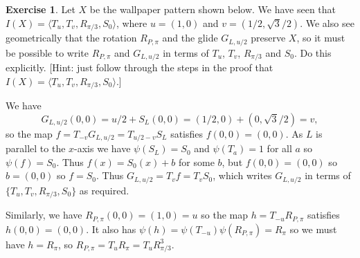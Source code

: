 \documentclass{amsart}
\renewcommand{\:}{\colon}
\newcommand{\ip}[1]{\langle #1\rangle}
\theoremstyle{definition}
\newtheorem{exercise}{Exercise}
\newenvironment{solution}{{\noindent\bf Solution:}}{}
\begin{document}
\begin{solution}
\end{solution}

\begin{exercise}
 Let $X$ be the wallpaper pattern shown below.  We have seen that
 $I(X)=\ip{T_u,T_v,R_{\pi/3},S_0}$, where $u=(1,0)$ and
 $v=(1/2,\sqrt{3}/2)$.  We also see geometrically that the rotation
 $R_{P,\pi}$ and the glide $G_{L,u/2}$ preserve $X$, so it must be
 possible to write $R_{P,\pi}$ and $G_{L,u/2}$ in terms of $T_u$,
 $T_v$, $R_{\pi/3}$ and $S_0$.  Do this explicitly.  [Hint: just
 follow through the steps in the proof that
 $I(X)=\ip{T_u,T_v,R_{\pi/3},S_0}$.]
 \begin{center}
 \end{center}
\end{exercise}
\begin{solution}
 We have 
 \[ G_{L,u/2}(0,0)=u/2+S_L(0,0)=(1/2,0)+(0,\sqrt{3}/2)=v, \]
 so the map $f=T_{-v}G_{L,u/2}=T_{u/2-v}S_L$ satisfies $f(0,0)=(0,0)$.
 As $L$ is parallel to the $x$-axis we have $\psi(S_L)=S_0$ and
 $\psi(T_a)=1$ for all $a$ so $\psi(f)=S_0$.  Thus $f(x)=S_0(x)+b$ for
 some $b$, but $f(0,0)=(0,0)$ so $b=(0,0)$ so $f=S_0$.  Thus
 $G_{L,u/2}=T_vf=T_vS_0$, which writes $G_{L,u/2}$ in terms of
 $\{T_u,T_v,R_{\pi/3},S_0\}$ as required.

 Similarly, we have $R_{P,\pi}(0,0)=(1,0)=u$ so the map
 $h=T_{-u}R_{P,\pi}$ satisfies $h(0,0)=(0,0)$.  It also has
 $\psi(h)=\psi(T_{-u})\psi(R_{P,\pi})=R_\pi$ so we must have
 $h=R_\pi$, so $R_{P,\pi}=T_uR_\pi=T_uR_{\pi/3}^3$.
\end{solution}
\end{document}
